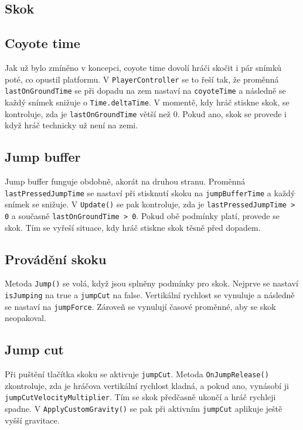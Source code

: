 \subsection{Skok}

\subsection{Coyote time}
Jak už bylo zmíněno v koncepci, coyote time dovolí hráči skočit i pár snímků poté, co opustil platformu. V \texttt{PlayerController} se to řeší tak, že proměnná \texttt{lastOnGroundTime} se při dopadu na zem nastaví na \texttt{coyoteTime} a následně se každý snímek snižuje o \texttt{Time.deltaTime}. V momentě, kdy hráč stiskne skok, se kontroluje, zda je \texttt{lastOnGroundTime} větší než 0. Pokud ano, skok se provede i když hráč technicky už není na zemi.

\subsection{Jump buffer}
Jump buffer funguje obdobně, akorát na druhou stranu. Proměnná \texttt{lastPressedJumpTime} se nastaví při stisknutí skoku na \texttt{jumpBufferTime} a každý snímek se snižuje. V \texttt{Update()} se pak kontroluje, zda je \texttt{lastPressedJumpTime > 0} a současně \texttt{lastOnGroundTime > 0}. Pokud obě podmínky platí, provede se skok. Tím se vyřeší situace, kdy hráč stiskne skok těsně před dopadem.

\subsection{Provádění skoku}
Metoda \texttt{Jump()} se volá, když jsou splněny podmínky pro skok. Nejprve se nastaví \texttt{isJumping} na true a \texttt{jumpCut} na false. Vertikální rychlost se vynuluje a následně se nastaví na \texttt{jumpForce}. Zároveň se vynulují časové proměnné, aby se skok neopakoval.

\subsection{Jump cut}
Při puštění tlačítka skoku se aktivuje \texttt{jumpCut}. Metoda \texttt{OnJumpRelease()} zkontroluje, zda je hráčova vertikální rychlost kladná, a pokud ano, vynásobí ji \texttt{jumpCutVelocityMultiplier}. Tím se skok předčasně ukončí a hráč rychleji spadne. V \texttt{ApplyCustomGravity()} se pak při aktivním \texttt{jumpCut} aplikuje ještě vyšší gravitace.

